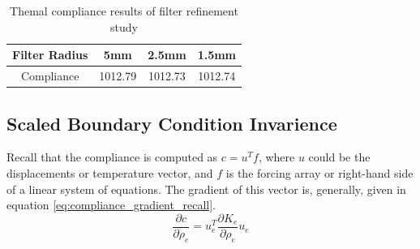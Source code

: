\begin{table}[ht]
  \centering
  \begin{tabular}{c | c | c | c}
    Filter Radius & 5mm & 2.5mm & 1.5mm \\ \hline
    Compliance & 1012.79 & 1012.73 & 1012.74 \\ \hline
  \end{tabular}
  \caption{Themal compliance results of filter refinement study}
  \label{table:filter_refinement_compliance_thermal}
\end{table}


\subsection*{Scaled Boundary Condition Invarience}
Recall that the compliance is computed as $c = u^Tf$, where $u$ could be the displacements or temperature vector, and $f$ is the forcing array or right-hand side of a linear system of equations. The gradient of this vector is, generally, given in equation \ref{eq:compliance_gradient_recall}.
\begin{equation}
  \frac{\partial c}{\partial \rho_e} = u_e^T\frac{\partial K_e}{\partial \rho_e}u_e
  \label{eq:compliance_gradient_recall}
\end{equation}

